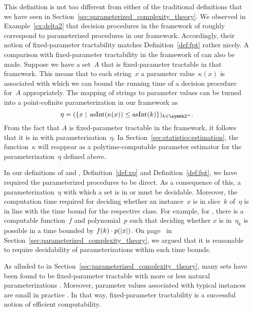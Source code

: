 This definition is not too different from either of the traditional definitions that we have seen in Section~\ref{sec:parameterized_complexity_theory}.
We observed in Example~\ref{ex:delta2} that decision procedures in the framework of \citeauthor{downey1999parameterized} roughly correspond to parameterized procedures in our framework.
Accordingly, their notion of fixed-parameter tractability matches Definition~\ref{def:fpt} rather nicely.
A comparison with fixed-parameter tractability in the framework of \citeauthor{flum2006parameterized} can also be made.
Suppose we have a set~$A$ that is fixed-parameter tractable in that framework.
This means that to each string~$x$ a parameter value~$\kappa(x)$ is associated with which we can bound the running time of a decision procedure for~$A$ appropriately.
The mapping of strings to parameter values can be turned into a point-cofinite parameterization in our framework as
\begin{equation}
\label{eq:flum_parameterization}
  \eta \deq (\{x \st \asNat(\kappa(x)) \le \asNat(k)\})_{k \in \binary^+}. \notag
\end{equation}
From the fact that $A$ is fixed-parameter tractable in the \citeauthor{flum2006parameterized} framework, it follows that it is in  with parameterization~$\eta$.
In Section~\ref{sec:statistics:estimation}, the function~$\kappa$ will reappear as a polytime-computable parameter estimator for the parameterization~$\eta$ defined above.

In our definitions of  and , Definition~\ref{def:xp} and Definition~\ref{def:fpt}, we have required the parameterized procedures to be direct.
As a consequence of this, a parameterization~$\eta$ with which a set is in  or  must be decidable.
Moreover, the computation time required for deciding whether an instance~$x$ is in slice~$k$ of~$\eta$ is in line with the time bound for the respective class.
For example, for , there is a computable function~$f$ and polynomial~$p$ such that deciding whether $x$ is in~$\eta_k$ is possible in a time bounded by $f(k) \cdot p({\lvert x\rvert})$.
On page~\pageref{p:computing_parameters} in Section~\ref{sec:parameterized_complexity_theory}, we argued that it is reasonable to require decidability of parameterizations within such time bounds.

As alluded to in Section~\ref{sec:parameterized_complexity_theory}, many sets have been found to be fixed-parameter tractable with more or less natural parameterizations \parencite{downey1995fixed,niedermeier2006invitation,cygan2015parameterized}.
Moreover, parameter values associated with typical instances are small in practice \parencite{downey1999framework,downey1999parameterized}.
In that way, fixed-parameter tractability is a successful notion of efficient computability.

